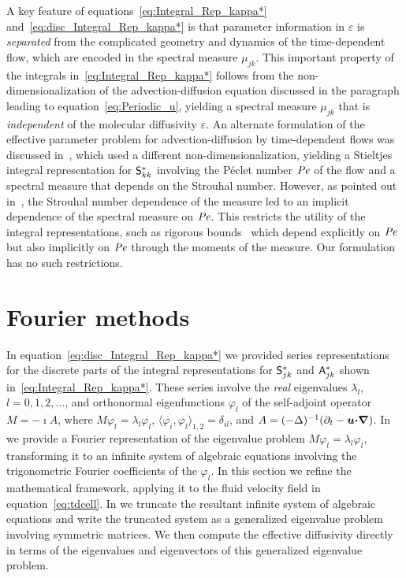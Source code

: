 \documentclass[amsa]{ipart}
\begin{document}
A key feature of equations~\eqref{eq:Integral_Rep_kappa*}
and~\eqref{eq:disc_Integral_Rep_kappa*} is that 
parameter information in $\varepsilon$ is \emph{separated} from the complicated
geometry and dynamics of the time-dependent flow, which are encoded
in the spectral measure $\mu_{jk}$. This important property of the integrals
in~\eqref{eq:Integral_Rep_kappa*} follows from the
non-dimensionalization of the advection-diffusion equation discussed
in the paragraph leading 
to equation~\eqref{eq:Periodic_u}, yielding a spectral measure $\mu_{jk}$ that
is \emph{independent} of the molecular diffusivity $\varepsilon$. An alternate
formulation of the effective parameter problem for advection-diffusion
by time-dependent flows was discussed in~\cite{Avellaneda:PRE:3249},
which used a different 
non-dimensionalization, yielding a Stieltjes integral representation
for $\mathsf{S}^*_{kk}$ involving the P{\'e}clet number $\mbox{\textit{Pe}}$ of the flow and a
spectral measure that depends on the Strouhal number. However, as pointed
out in~\cite{Bonn:McLaughlin:JFM:2001:345}, the Strouhal number
dependence of the measure led to an implicit
dependence of the spectral measure on $\mbox{\textit{Pe}}$. This restricts the
utility of the integral representations, such as rigorous
bounds~\cite{Baker:1996:Book:Pade,Golden:CMP-473} which depend
explicitly on $\mbox{\textit{Pe}}$ but also implicitly on $\mbox{\textit{Pe}}$ through the
moments of the measure. Our formulation has no such restrictions. 




  
\section{Fourier methods}
\label{sec:Fourier_Methods} 
%
In equation~\eqref{eq:disc_Integral_Rep_kappa*} we provided series
representations for the discrete parts of the integral representations
for $\mathsf{S}^*_{jk}$ and $\mathsf{A}^*_{jk}$ shown
in~\eqref{eq:Integral_Rep_kappa*}. These series involve the  
\emph{real} 
eigenvalues $\lambda_l$, $l=0,1,2,\ldots$, and orthonormal eigenfunctions $\varphi_l$ 
of the self-adjoint operator $M=-\imath A$, where $M\varphi_l=\lambda_l\varphi_l$,
$\langle\varphi_i,\varphi_l\rangle_{1,2}=\delta_{il}$, and $A=(-\Delta)^{-1}(\partial_t-\boldsymbol{u} \mbox{\boldmath${\cdot}$}\mbox{\boldmath${\nabla}$})$. In
 we provide a Fourier representation
of the eigenvalue problem $M\varphi_l=\lambda_l\varphi_l$, transforming it to an
infinite system of algebraic equations involving the trigonometric
Fourier coefficients of the $\varphi_l$. In this section we
refine the mathematical framework, applying it to the fluid velocity
field in equation~\eqref{eq:tdcell}. In  we
truncate the resultant infinite system of algebraic equations and write
the truncated system as a generalized eigenvalue problem involving
symmetric matrices. We then compute the effective diffusivity directly
in terms of the eigenvalues and eigenvectors of this generalized
eigenvalue problem. 
\end{document}
